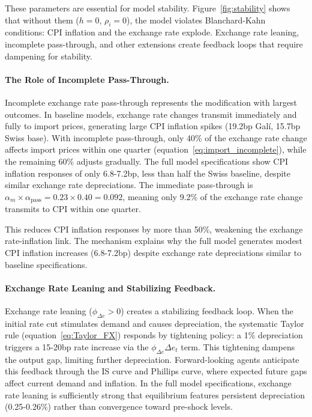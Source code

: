 \documentclass[12pt,a4paper]{article}
\begin{document}
These parameters are essential for model stability. Figure~\ref{fig:stability} 
shows that without them ($h=0$, $\rho_i=0$), the model violates Blanchard-Kahn 
conditions: CPI inflation and the exchange rate explode. Exchange rate leaning, incomplete pass-through, and other extensions create feedback loops that require dampening for stability.

\paragraph{The Role of Incomplete Pass-Through.}
Incomplete exchange rate pass-through represents the modification with largest outcomes. In baseline models, exchange rate changes transmit immediately and fully to import prices, generating large CPI inflation spikes (19.2bp Galí, 15.7bp Swiss base). With incomplete pass-through, only 40\% of the exchange rate change affects import prices within one quarter (equation~\ref{eq:import_incomplete}), while the remaining 60\% adjusts gradually. The full model specifications show CPI inflation responses of only 6.8-7.2bp, less than half the Swiss baseline, despite similar exchange rate depreciations. The immediate pass-through is $\alpha_m \times \alpha_{\text{pass}} = 0.23 \times 0.40 = 0.092$, meaning only 9.2\% of the exchange rate change transmits to CPI within one quarter.

This reduces CPI inflation responses by more than 50\%, weakening the exchange 
rate-inflation link. The mechanism explains why the full model generates modest CPI inflation increases (6.8-7.2bp) despite exchange rate depreciations similar to baseline specifications.

\paragraph{Exchange Rate Leaning and Stabilizing Feedback.}
Exchange rate leaning ($\phi_{\Delta e} > 0$) creates a stabilizing feedback loop. When the initial rate cut stimulates demand and causes depreciation, the systematic Taylor rule (equation~\ref{eq:Taylor_FX}) responds by tightening policy: a 1\% depreciation triggers a 15-20bp rate increase via the $\phi_{\Delta e}\Delta e_t$ term. This tightening dampens the output gap, limiting further depreciation. Forward-looking agents anticipate this feedback through the IS curve and Phillips curve, where expected future gaps affect current demand and inflation. In the full model specifications, exchange rate leaning is sufficiently strong that equilibrium features persistent depreciation (0.25-0.26\%) rather than convergence toward pre-shock levels.
\end{document}
